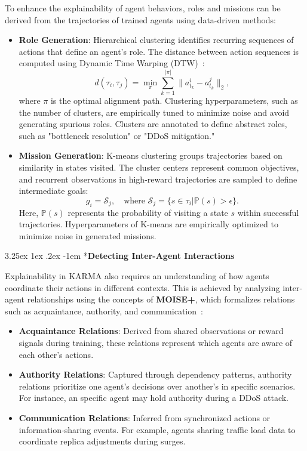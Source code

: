 \documentclass[conference]{IEEEtran}
\makeatletter
\renewcommand\paragraph{\@startsection{paragraph}{5}{\z@}%
  {3.25ex \@plus1ex \@minus.2ex}%
  {-1em}%
  {\normalfont\normalsize\bfseries}}
\makeatother
\begin{document}
To enhance the explainability of agent behaviors, roles and missions can be derived from the trajectories of trained agents using data-driven methods:
\begin{itemize}
    \item \textbf{Role Generation}: Hierarchical clustering identifies recurring sequences of actions that define an agent's role. The distance between action sequences is computed using Dynamic Time Warping (DTW)~\cite{berndt1994using}:
    \[
    d(\tau_i, \tau_j) = \min_{\pi} \sum_{k=1}^{|\pi|} \|a_{t_k}^i - a_{t_k}^j\|_2,
    \]
    where $\pi$ is the optimal alignment path. Clustering hyperparameters, such as the number of clusters, are empirically tuned to minimize noise and avoid generating spurious roles. Clusters are annotated to define abstract roles, such as "bottleneck resolution" or "DDoS mitigation."
    \item \textbf{Mission Generation}: K-means clustering groups trajectories based on similarity in states visited. The cluster centers represent common objectives, and recurrent observations in high-reward trajectories are sampled to define intermediate goals:
    \[
    g_i = \mathcal{S}_j, \quad \text{where } \mathcal{S}_j = \{s \in \tau_i | \mathbb{P}(s) > \epsilon\}.
    \]
    Here, $\mathbb{P}(s)$ represents the probability of visiting a state $s$ within successful trajectories. Hyperparameters of K-means are empirically optimized to minimize noise in generated missions.
\end{itemize}

\paragraph*{\textbf{Detecting Inter-Agent Interactions}}

Explainability in KARMA also requires an understanding of how agents coordinate their actions in different contexts. This is achieved by analyzing inter-agent relationships using the concepts of \textbf{MOISE+}, which formalizes relations such as acquaintance, authority, and communication~\cite{hubner2002moise}:
\begin{itemize}
    \item \textbf{Acquaintance Relations}: Derived from shared observations or reward signals during training, these relations represent which agents are aware of each other's actions.
    \item \textbf{Authority Relations}: Captured through dependency patterns, authority relations prioritize one agent's decisions over another's in specific scenarios. For instance, an specific agent may hold authority during a DDoS attack.
    \item \textbf{Communication Relations}: Inferred from synchronized actions or information-sharing events. For example, agents sharing traffic load data to coordinate replica adjustments during surges.
\end{itemize}
\end{document}
